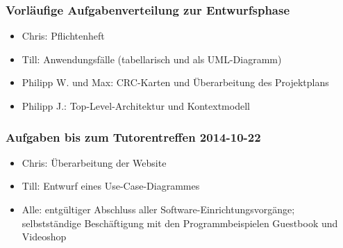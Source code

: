 \documentclass[12pt,a4paper]{article}
\begin{document}
\subsubsection*{Vorläufige Aufgabenverteilung zur Entwurfsphase}
\begin{itemize}
\item Chris: Pflichtenheft
\item Till: Anwendungsfälle (tabellarisch und als UML-Diagramm)
\item Philipp W. und Max: CRC-Karten und Überarbeitung des Projektplans
\item Philipp J.: Top-Level-Architektur und Kontextmodell
\end{itemize}

\subsubsection*{Aufgaben bis zum Tutorentreffen 2014-10-22}
\begin{itemize}
\item Chris: Überarbeitung der Website
\item Till: Entwurf eines Use-Case-Diagrammes
\item Alle: entgültiger Abschluss aller Software-Einrichtungsvorgänge; selbstständige Beschäftigung mit den Programmbeispielen Guestbook und Videoshop
\end{itemize}
\end{document}
